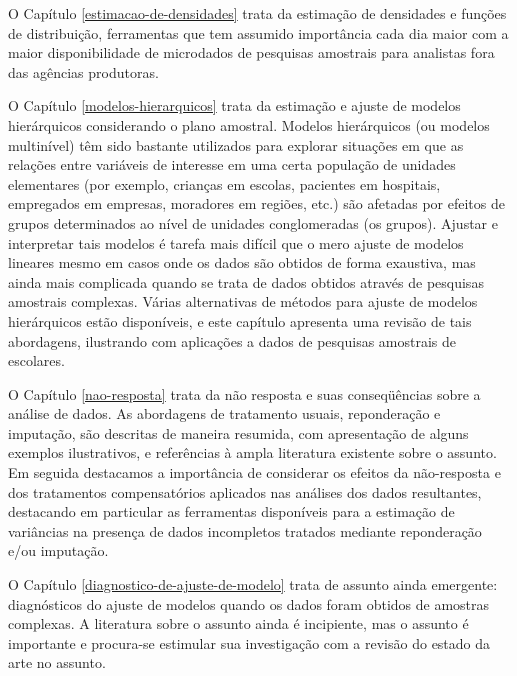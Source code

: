 \documentclass[]{book}
\numberwithin{example}{chapter}
\numberwithin{remark}{chapter}
\numberwithin{definition}{chapter}
\begin{document}
O Capítulo \ref{estimacao-de-densidades} trata da estimação de
densidades e funções de distribuição, ferramentas que tem assumido
importância cada dia maior com a maior disponibilidade de microdados de
pesquisas amostrais para analistas fora das agências produtoras.

O Capítulo \ref{modelos-hierarquicos} trata da estimação e ajuste de
modelos hierárquicos considerando o plano amostral. Modelos hierárquicos
(ou modelos multinível) têm sido bastante utilizados para explorar
situações em que as relações entre variáveis de interesse em uma certa
população de unidades elementares (por exemplo, crianças em escolas,
pacientes em hospitais, empregados em empresas, moradores em regiões,
etc.) são afetadas por efeitos de grupos determinados ao nível de
unidades conglomeradas (os grupos). Ajustar e interpretar tais modelos é
tarefa mais difícil que o mero ajuste de modelos lineares mesmo em casos
onde os dados são obtidos de forma exaustiva, mas ainda mais complicada
quando se trata de dados obtidos através de pesquisas amostrais
complexas. Várias alternativas de métodos para ajuste de modelos
hierárquicos estão disponíveis, e este capítulo apresenta uma revisão de
tais abordagens, ilustrando com aplicações a dados de pesquisas
amostrais de escolares.

O Capítulo \ref{nao-resposta} trata da não resposta e suas conseqüências
sobre a análise de dados. As abordagens de tratamento usuais,
reponderação e imputação, são descritas de maneira resumida, com
apresentação de alguns exemplos ilustrativos, e referências à ampla
literatura existente sobre o assunto. Em seguida destacamos a
importância de considerar os efeitos da não-resposta e dos tratamentos
compensatórios aplicados nas análises dos dados resultantes, destacando
em particular as ferramentas disponíveis para a estimação de variâncias
na presença de dados incompletos tratados mediante reponderação e/ou
imputação.

O Capítulo \ref{diagnostico-de-ajuste-de-modelo} trata de assunto ainda
emergente: diagnósticos do ajuste de modelos quando os dados foram
obtidos de amostras complexas. A literatura sobre o assunto ainda é
incipiente, mas o assunto é importante e procura-se estimular sua
investigação com a revisão do estado da arte no assunto.
\end{document}
